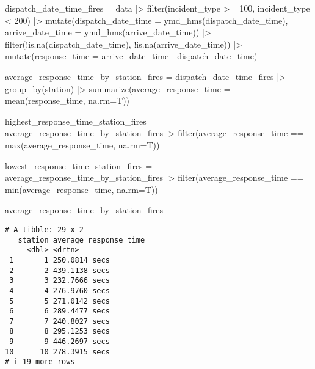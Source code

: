 \documentclass[
  letterpaper,
  DIV=11,
  numbers=noendperiod]{scrartcl}
\newenvironment{Shaded}{\begin{snugshade}}{\end{snugshade}}
\newcommand{\AttributeTok}[1]{\textcolor[rgb]{0.40,0.45,0.13}{#1}}
\newcommand{\DecValTok}[1]{\textcolor[rgb]{0.68,0.00,0.00}{#1}}
\newcommand{\FunctionTok}[1]{\textcolor[rgb]{0.28,0.35,0.67}{#1}}
\newcommand{\NormalTok}[1]{\textcolor[rgb]{0.00,0.23,0.31}{#1}}
\newcommand{\OtherTok}[1]{\textcolor[rgb]{0.00,0.23,0.31}{#1}}
\newcommand{\SpecialCharTok}[1]{\textcolor[rgb]{0.37,0.37,0.37}{#1}}
\begin{document}
\begin{Shaded}
\begin{Highlighting}[]
\NormalTok{dispatch\_date\_time\_fires }\OtherTok{=}\NormalTok{ data }\SpecialCharTok{|\textgreater{}}
  \FunctionTok{filter}\NormalTok{(incident\_type }\SpecialCharTok{\textgreater{}=} \DecValTok{100}\NormalTok{, incident\_type }\SpecialCharTok{\textless{}} \DecValTok{200}\NormalTok{) }\SpecialCharTok{|\textgreater{}}
  \FunctionTok{mutate}\NormalTok{(}\AttributeTok{dispatch\_date\_time =} \FunctionTok{ymd\_hms}\NormalTok{(dispatch\_date\_time), }\AttributeTok{arrive\_date\_time =} \FunctionTok{ymd\_hms}\NormalTok{(arrive\_date\_time)) }\SpecialCharTok{|\textgreater{}}
  \FunctionTok{filter}\NormalTok{(}\SpecialCharTok{!}\FunctionTok{is.na}\NormalTok{(dispatch\_date\_time), }\SpecialCharTok{!}\FunctionTok{is.na}\NormalTok{(arrive\_date\_time)) }\SpecialCharTok{|\textgreater{}}
  \FunctionTok{mutate}\NormalTok{(}\AttributeTok{response\_time =}\NormalTok{ arrive\_date\_time }\SpecialCharTok{{-}}\NormalTok{ dispatch\_date\_time) }
  
\NormalTok{average\_response\_time\_by\_station\_fires }\OtherTok{=}\NormalTok{ dispatch\_date\_time\_fires }\SpecialCharTok{|\textgreater{}}
    \FunctionTok{group\_by}\NormalTok{(station) }\SpecialCharTok{|\textgreater{}}
    \FunctionTok{summarize}\NormalTok{(}\AttributeTok{average\_response\_time =} \FunctionTok{mean}\NormalTok{(response\_time, }\AttributeTok{na.rm=}\NormalTok{T))}
  
\NormalTok{highest\_response\_time\_station\_fires }\OtherTok{=}\NormalTok{ average\_response\_time\_by\_station\_fires }\SpecialCharTok{|\textgreater{}}
  \FunctionTok{filter}\NormalTok{(average\_response\_time }\SpecialCharTok{==} \FunctionTok{max}\NormalTok{(average\_response\_time, }\AttributeTok{na.rm=}\NormalTok{T))}
  
\NormalTok{lowest\_response\_time\_station\_fires }\OtherTok{=}\NormalTok{ average\_response\_time\_by\_station\_fires }\SpecialCharTok{|\textgreater{}}
  \FunctionTok{filter}\NormalTok{(average\_response\_time }\SpecialCharTok{==} \FunctionTok{min}\NormalTok{(average\_response\_time, }\AttributeTok{na.rm=}\NormalTok{T))}

\NormalTok{average\_response\_time\_by\_station\_fires}
\end{Highlighting}
\end{Shaded}

\begin{verbatim}
# A tibble: 29 x 2
   station average_response_time
     <dbl> <drtn>               
 1       1 250.0814 secs        
 2       2 439.1138 secs        
 3       3 232.7666 secs        
 4       4 276.9760 secs        
 5       5 271.0142 secs        
 6       6 289.4477 secs        
 7       7 240.8027 secs        
 8       8 295.1253 secs        
 9       9 446.2697 secs        
10      10 278.3915 secs        
# i 19 more rows
\end{verbatim}
\end{document}
